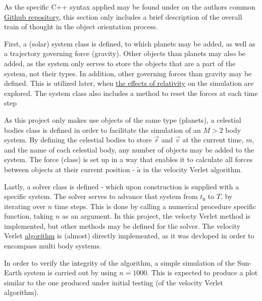 \documentclass[%
oneside,                 %
final,                   %
10pt]{article}
\begin{document}
As the specific C++ syntax applied may be found under on the authors common \href{https://github.com/johanere/CP3}{Github repository}, this section only includes a brief description of the overall train of thought in the object orientation process. \newline

First, a (solar) system class is defined, to which planets may be added, as well as a trajectory governing force (gravity). Other objects than planets may also be added, as the system only serves to store the objects that are a part of the system, not their types. In addition, other governing forces than gravity may be defined. This is utilized later, when \hyperref[sec:M.effectsofrel]{the effects of relativity} on the simulation are explored. The system class also includes a method to reset the forces at each time step\newline

As this project only makes use objects of the same type (planets), a celestial bodies class is defined in order to facilitate the simulation of an $M>2$ body system. By defining the celestial bodies to store $\vec{r}$ and $\vec{v}$ at the current time, $m$, and the name of each celestial body, any number of objects may be added to the system. The force (class) is set up in a way that enables it to calculate all forces between objects at their current position - $\tilde{a}$ in the velocity Verlet algorithm. \newline

Lastly, a solver class is defined - which upon construction is supplied with a specific system. The solver serves to advance that system from $t_{0}$ to $T$, by iterating over $n$ time steps. This is done by calling a numerical procedure specific function, taking $n$ as an argument. In this project, the velocty Verlet method is implemented, but other methods may be defined for the solver. The velocity Verlet \hyperref[subsec:algos]{algorithm} is (almost) directly implemented, as it was devloped in order to encompass multi body systems. \newline

In order to verify the integrity of the algorithm, a simple simulation of the Sun-Earth system is carried out by using $n=1000$. This is expected to produce a plot similar to the one produced under initial testing (of the velocity Verlet algorithm).
\end{document}
